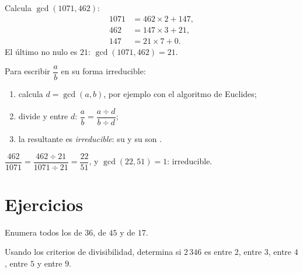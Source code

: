 \begin{example}\label{ex:g9:arith:euclidalgo}
Calcula $\gcd(1071, 462)$:
\begin{align*}
1071 &= 462 \times 2 + 147, \\
462 &= 147 \times 3 + 21, \\
147 &= 21 \times 7 + 0 .
\end{align*}
El último  no nulo es $21$: $\gcd(1071, 462) = 21$.
\end{example}

\begin{method}\label{met:g9:arith:simplify}
Para escribir $\dfrac ab$ en su forma irreducible:
\begin{enumerate}
  \item calcula $d = \gcd(a, b)$, por ejemplo con el algoritmo de Euclides;
  \item divide  y  entre $d$:
        $\dfrac ab = \dfrac{a \div d}{b \div d}$;
  \item la  resultante es \emph{irreducible}: su  y su
         son .
\end{enumerate}
\end{method}

\begin{example}
$\dfrac{462}{1071} = \dfrac{462 \div 21}{1071 \div 21} = \dfrac{22}{51}$,
y $\gcd(22, 51) = 1$: irreducible.
\end{example}

\section{Ejercicios}

\begin{exercise}[$\star$]\label{exo:g9:arith:1}
Enumera todos los  de $36$, de $45$ y de $17$.
\end{exercise}

\begin{exercise}[$\star$]\label{exo:g9:arith:2}
Usando los criterios de divisibilidad, determina si $2\,346$ es  entre
$2$, entre $3$, entre $4$, entre $5$ y entre $9$.
\end{exercise}

